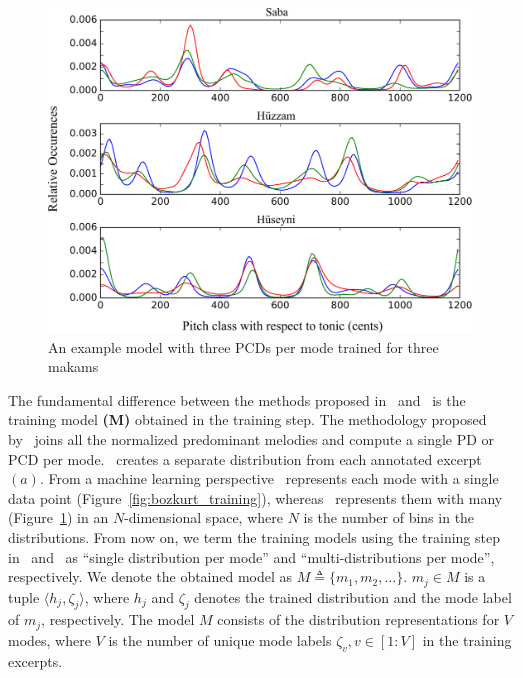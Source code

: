 \documentclass{sig-alternate}
\begin{document}
\begin{figure}
\centering
\includegraphics[width=.95\columnwidth]{figures/chordia_pcd}
\caption{An example model with three PCDs per mode trained for three makams}
\label{fig:chordia_training}
\end{figure}

The fundamental difference between the methods proposed in~\cite{bozkurt_makam} and~\cite{chordia} is the training model {\bf (M)} obtained in the training step. The methodology proposed by~\cite{bozkurt_makam} joins all the normalized predominant melodies and compute a single PD or PCD per mode.~\cite{chordia} creates a separate distribution from each annotated excerpt $(a)$. From a machine learning perspective~\cite{bozkurt_makam} represents each mode with a single data point (Figure~\ref{fig:bozkurt_training}), whereas~\cite{chordia} represents them with many (Figure~\ref{fig:chordia_training}) in an $N$-dimensional space, where $N$ is the number of bins in the distributions. From now on, we term the training models using the training step in~\cite{bozkurt_makam} and~\cite{chordia} as ``single distribution per mode'' and ``multi-distributions per mode'', respectively. We denote the obtained model as $M \triangleq \{m_1, m_2, \dots\}$. $m_j \in M$ is a tuple $\langle h_j, \zeta_j\rangle$, where $h_j$ and $\zeta_j$ denotes the trained distribution and the mode label of $m_j$, respectively. The model $M$ consists of the distribution representations for $V$ modes, where $V$ is the number of unique mode labels $\zeta_v, v \in [1:V]$ in the training excerpts.
\end{document}
